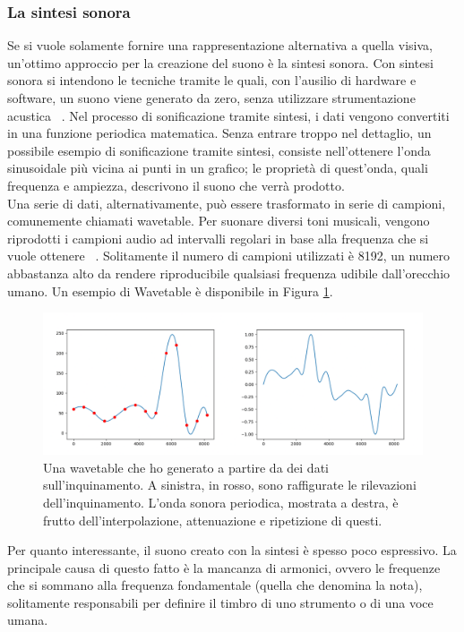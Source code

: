 \subsubsection{La sintesi sonora}
Se si vuole solamente fornire una rappresentazione alternativa a quella visiva, un'ottimo approccio per la creazione del suono è la sintesi sonora.
Con sintesi sonora si intendono le tecniche tramite le quali, con l'ausilio di hardware e software, un suono viene generato da zero, senza utilizzare strumentazione acustica ~\cite{izotope}.
Nel processo di sonificazione tramite sintesi, i dati vengono convertiti in una funzione periodica matematica.
Senza entrare troppo nel dettaglio, un possibile esempio di sonificazione tramite sintesi, consiste nell'ottenere l'onda sinusoidale più vicina ai punti in un grafico; le proprietà di quest'onda, quali frequenza e ampiezza, descrivono il suono che verrà prodotto.
\\
Una serie di dati, alternativamente, può essere trasformato in serie di campioni, comunemente chiamati wavetable.
Per suonare diversi toni musicali, vengono riprodotti i campioni audio ad intervalli regolari in base alla frequenza che si vuole ottenere ~\cite{serum}.
Solitamente il numero di campioni utilizzati è 8192, un numero abbastanza alto da rendere riproducibile qualsiasi frequenza udibile dall'orecchio umano. Un esempio di Wavetable è disponibile in Figura \ref{fig:wavetable}.
\begin{figure}[H]
  \includegraphics[width=\linewidth]{img/image.png}
  \caption{Una wavetable che ho generato a partire da dei dati sull'inquinamento.
  A sinistra, in rosso, sono raffigurate le rilevazioni dell'inquinamento. L'onda sonora periodica, mostrata a destra, è frutto dell'interpolazione, attenuazione e ripetizione di questi.}
  \label{fig:wavetable}
\end{figure}

 
Per quanto interessante, il suono creato con la sintesi è spesso poco espressivo.
La principale causa di questo fatto è la mancanza di armonici, ovvero le frequenze che si sommano alla frequenza fondamentale (quella che denomina la nota), solitamente responsabili per definire il timbro di uno strumento o di una voce umana.
